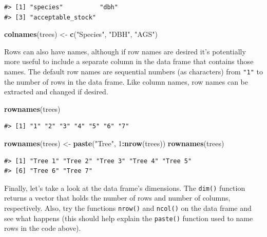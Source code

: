 \documentclass[
  11pt,
]{krantz}
\newenvironment{Shaded}{\begin{snugshade}}{\end{snugshade}}
\newcommand{\DecValTok}[1]{\textcolor[rgb]{0.00,0.00,0.81}{#1}}
\newcommand{\KeywordTok}[1]{\textcolor[rgb]{0.13,0.29,0.53}{\textbf{#1}}}
\newcommand{\NormalTok}[1]{#1}
\newcommand{\OperatorTok}[1]{\textcolor[rgb]{0.81,0.36,0.00}{\textbf{#1}}}
\newcommand{\StringTok}[1]{\textcolor[rgb]{0.31,0.60,0.02}{#1}}
\theoremstyle{definition}
\theoremstyle{definition}
\theoremstyle{definition}
\theoremstyle{definition}
\theoremstyle{remark}
\begin{document}
\begin{verbatim}
#> [1] "species"          "dbh"             
#> [3] "acceptable_stock"
\end{verbatim}

\begin{Shaded}
\begin{Highlighting}[]
\KeywordTok{colnames}\NormalTok{(trees) \textless{}{-}}\StringTok{ }\KeywordTok{c}\NormalTok{(}\StringTok{"Species"}\NormalTok{, }\StringTok{"DBH"}\NormalTok{, }\StringTok{"AGS"}\NormalTok{)}
\end{Highlighting}
\end{Shaded}

Rows can also have names, although if row names are desired it's potentially more useful to include a separate column in the data frame that contains those names. The default row names are sequential numbers (as characters) from \texttt{"1"} to the number of rows in the data frame. Like column names, row names can be extracted and changed if desired.

\begin{Shaded}
\begin{Highlighting}[]
\KeywordTok{rownames}\NormalTok{(trees)}
\end{Highlighting}
\end{Shaded}

\begin{verbatim}
#> [1] "1" "2" "3" "4" "5" "6" "7"
\end{verbatim}

\begin{Shaded}
\begin{Highlighting}[]
\KeywordTok{rownames}\NormalTok{(trees) \textless{}{-}}\StringTok{ }\KeywordTok{paste}\NormalTok{(}\StringTok{"Tree"}\NormalTok{, }\DecValTok{1}\OperatorTok{:}\KeywordTok{nrow}\NormalTok{(trees))}
\KeywordTok{rownames}\NormalTok{(trees)}
\end{Highlighting}
\end{Shaded}

\begin{verbatim}
#> [1] "Tree 1" "Tree 2" "Tree 3" "Tree 4" "Tree 5"
#> [6] "Tree 6" "Tree 7"
\end{verbatim}

Finally, let's take a look at the data frame's dimensions. The \texttt{dim()} function returns a vector that holds the number of rows and number of columns, respectively. Also, try the functions \texttt{nrow()} and \texttt{ncol()} on the data frame and see what happens (this should help explain the \texttt{paste()} function used to name rows in the code above).
\end{document}
